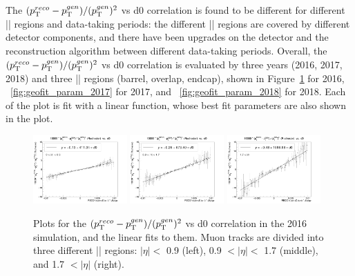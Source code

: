 The $(p_{\mathrm{T}}^{reco}-p_{\mathrm{T}}^{gen})/ (p_{\mathrm{T}}^{gen})^{2}$ vs d0 correlation is found to be different for different |\eta| regions and data-taking periods:
the different |\eta| regions are covered by different detector components, and there have been upgrades on the detector and the reconstruction algorithm between different data-taking periods.
Overall, the $(p_{\mathrm{T}}^{reco}-p_{\mathrm{T}}^{gen})/ (p_{\mathrm{T}}^{gen})^{2}$ vs d0 correlation is evaluated by three years (2016, 2017, 2018) and 
three |\eta| regions (barrel, overlap, endcap), shown in Figure~\ref{fig:geofit_param_2016} for 2016, ~\ref{fig:geofit_param_2017} for 2017, and ~\ref{fig:geofit_param_2018} for 2018.
Each of the plot is fit with a linear function, whose best fit parameters are also shown in the plot.

\begin{figure}[!htb]
      \centering
      \captionsetup{justification=justified}
      \includegraphics[width=0.32\textwidth]{pics/muon_corr/GeoFit/fit_results/2016_DY_eta_0_0p9_dRelPt2p0_Roch.png}
      \includegraphics[width=0.32\textwidth]{pics/muon_corr/GeoFit/fit_results/2016_DY_eta_0p9_1p7_dRelPt2p0_Roch.png}
      \includegraphics[width=0.32\textwidth]{pics/muon_corr/GeoFit/fit_results/2016_DY_eta_1p7_inf_dRelPt2p0_Roch.png}
      \caption{Plots for the $(p_{\mathrm{T}}^{reco}-p_{\mathrm{T}}^{gen})/ (p_{\mathrm{T}}^{gen})^{2}$ vs d0 correlation in the 2016 \DY simulation, 
               and the linear fits to them. Muon tracks are divided into three different |\eta| regions:
               $|\eta| <$ 0.9 (left), 0.9 $< |\eta| <$ 1.7 (middle), and 1.7 $< |\eta|$ (right).
               }
      \label{fig:geofit_param_2016}
\end{figure}

